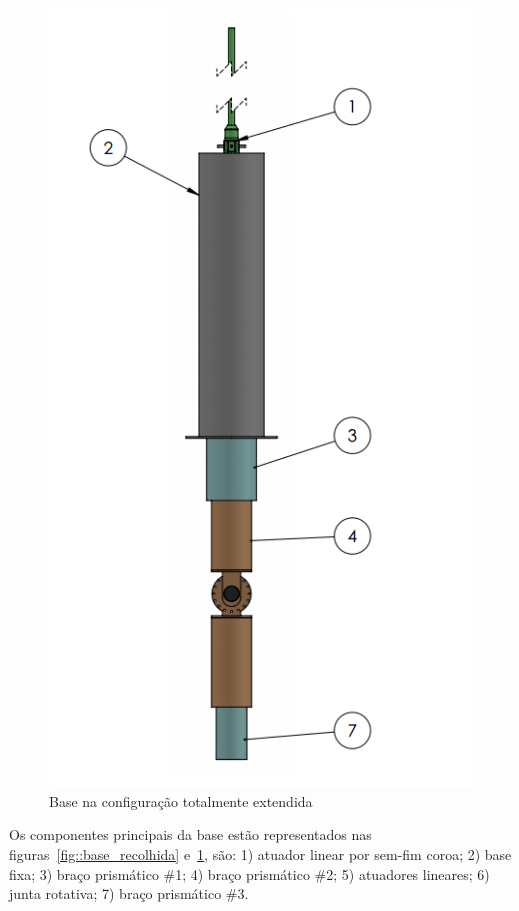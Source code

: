 \begin{figure}[h!]
\centering
	\includegraphics[width=\columnwidth]{figs/estudo/solid/Base_Extendida.PNG} 
	\caption{Base na configuração totalmente extendida}
	\label{fig::base_extendida}
\end{figure}

Os componentes principais da base estão representados nas
figuras~\ref{fig::base_recolhida} e~\ref{fig::base_extendida}, são: 1) atuador
linear por sem-fim coroa; 2) base fixa; 3) braço prismático \#1; 4) braço
prismático \#2; 5) atuadores lineares; 6) junta rotativa; 7) braço prismático
\#3.


